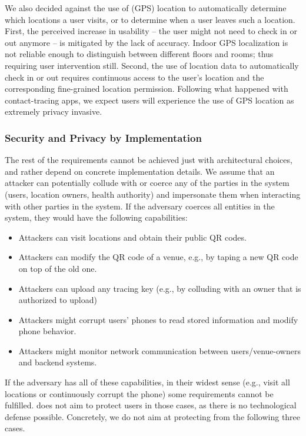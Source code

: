  We also decided against the use of (GPS) location to automatically determine which locations a user visits, or to determine when a user leaves such a location. First, the perceived increase in usability -- the user might not need to check in or out anymore -- is mitigated by the lack of accuracy. Indoor GPS localization is not reliable enough to distinguish between different floors and rooms; thus requiring user intervention still. Second, the use of location data to automatically check in or out requires continuous access to the user's location and the corresponding fine-grained location permission. Following what happened with contact-tracing apps, we expect users will experience the use of GPS location as extremely privacy invasive.

\subsubsection{Security and Privacy by Implementation}

The rest of the requirements cannot be achieved just with architectural choices, and rather depend on concrete implementation details. We assume that an attacker can potentially collude with or coerce any of the parties in the system (users, location owners, health authority) and impersonate them when interacting with other parties in the system. 
If the adversary coerces all entities in the system, they would have the following capabilities:
\begin{itemize}[topsep=0pt, partopsep=0pt]
\item Attackers can visit locations and obtain their public QR codes.
\item Attackers can modify the QR code of a venue, e.g., by taping a new QR code on top of the old one.
\item Attackers can upload any tracing key (e.g., by colluding with an owner that is authorized to upload)
\item Attackers might corrupt users' phones to read stored information and modify phone behavior.
\item Attackers might monitor network communication between users/venue-owners and backend systems.
\end{itemize}
If the adversary has all of these capabilities, in their widest sense (e.g., visit all locations or continuously corrupt the phone) some requirements cannot be fulfilled. \name does not aim to protect users in those cases, as there is no technological defense possible. Concretely, we do not aim at protecting from the following three cases.

